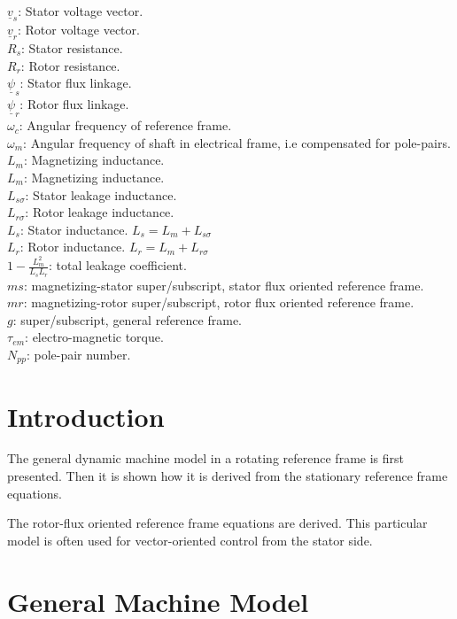 \documentclass[]{book}
\begin{document}
\(\underline{v}_s\): Stator voltage vector.\\
\(\underline{v}_r\): Rotor voltage vector.\\
\(R_s\): Stator resistance.\\
\(R_r\): Rotor resistance.\\
\(\underline{\psi}_s\): Stator flux linkage.\\
\(\underline{\psi}_r\): Rotor flux linkage.\\
\(\omega_c\): Angular frequency of reference frame.\\
\(\omega_m\): Angular frequency of shaft in electrical frame, i.e compensated for pole-pairs.\\
\(L_m\): Magnetizing inductance.\\
\(L_m\): Magnetizing inductance.\\
\(L_{s\sigma}\): Stator leakage inductance.\\
\(L_{r\sigma}\): Rotor leakage inductance.\\
\(L_s\): Stator inductance. \(L_s = L_m + L_{s\sigma}\)\\
\(L_r\): Rotor inductance. \(L_r = L_m + L_{r\sigma}\)\\
\(1-\frac{L^2_m}{L_sL_r}\): total leakage coefficient.\\
\(ms\): magnetizing-stator super/subscript, stator flux oriented reference frame.\\
\(mr\): magnetizing-rotor super/subscript, rotor flux oriented reference frame.\\
\(g\): super/subscript, general reference frame.\\
\(\tau_{em}\): electro-magnetic torque.\\
\(N_{pp}\): pole-pair number.\\

\hypertarget{introduction}{%
\section{Introduction}\label{introduction}}

The general dynamic machine model in a rotating reference frame is first presented. Then it is shown how it is derived from the stationary reference frame equations.

The rotor-flux oriented reference frame equations are derived. This particular model is often used for vector-oriented control from the stator side.

\hypertarget{general-machine-model}{%
\section{General Machine Model}\label{general-machine-model}}
\end{document}
